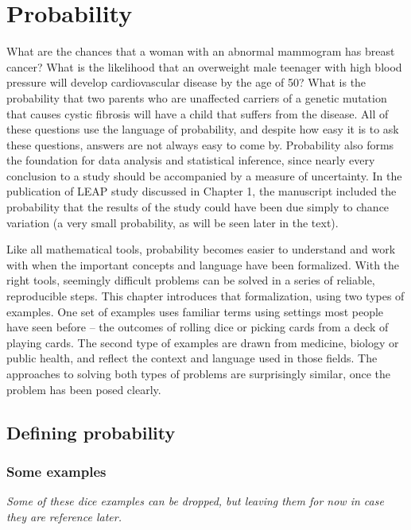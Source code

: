 \chapter{Probability}
\label{probability}


What are the chances that a woman with an abnormal mammogram has breast cancer?  What is the likelihood that an overweight male teenager with high blood pressure will develop cardiovascular disease by the age of 50?  What is the probability that two parents who are unaffected carriers of a genetic mutation that causes cystic fibrosis will have a child that suffers from the disease. All of these questions use the language of probability, and despite how easy it is to ask these questions,  answers are not always easy to come by.  Probability also forms the foundation for data analysis and statistical inference, since nearly every conclusion to a study should be accompanied by a measure of uncertainty.  In the publication of  LEAP study discussed in Chapter 1, the manuscript included the probability that the results of the study could have been due simply to chance variation (a very small probability, as will be seen later in the text).

Like all mathematical tools, probability becomes easier to understand and work with when the important concepts and language have been formalized.   With the right tools, seemingly difficult problems can be solved in a series of reliable, reproducible steps.  This chapter introduces that formalization, using two types of examples.  One set of examples uses familiar terms using settings most people have seen before -- the outcomes of rolling dice or picking cards from a deck of playing cards.  The second type of examples are drawn from medicine, biology or public health, and reflect the context and language used in those fields. The approaches to solving both types of problems are surprisingly similar, once the problem has been posed clearly.

\section{Defining probability}
\label{basicsOfProbability}

\subsection{Some examples}

\textit{Some of these dice examples can be dropped, but leaving them for now in case they are reference later. }

